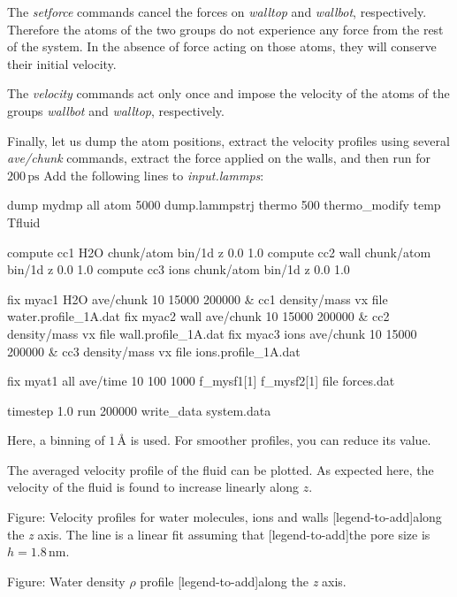 \noindent The \textit{setforce} commands cancel the forces on \textit{walltop} and
\textit{wallbot}, respectively. Therefore the atoms of the two groups do not
experience any force from the rest of the system. In the absence of force
acting on those atoms, they will conserve their initial velocity.

\vspace{0.25cm} \noindent The \textit{velocity} commands act only once and impose
the velocity of the atoms of the groups \textit{wallbot}
and \textit{walltop}, respectively.

\vspace{0.25cm} \noindent Finally, let us dump the atom positions, extract the
velocity profiles using several \textit{ave/chunk} commands, extract the
force applied on the walls, and then run for $200\,\text{ps}$
Add the following lines to \textit{input.lammps}:

\begin{lcverbatim}
dump mydmp all atom 5000 dump.lammpstrj
thermo 500
thermo_modify temp Tfluid

compute cc1 H2O chunk/atom bin/1d z 0.0 1.0
compute cc2 wall chunk/atom bin/1d z 0.0 1.0
compute cc3 ions chunk/atom bin/1d z 0.0 1.0

fix myac1 H2O ave/chunk 10 15000 200000 &
cc1 density/mass vx file water.profile_1A.dat
fix myac2 wall ave/chunk 10 15000 200000 &
cc2 density/mass vx file wall.profile_1A.dat
fix myac3 ions ave/chunk 10 15000 200000 &
cc3 density/mass vx file ions.profile_1A.dat

fix myat1 all ave/time 10 100 1000 f_mysf1[1] f_mysf2[1] file forces.dat

timestep 1.0
run 200000
write_data system.data
\end{lcverbatim}

\noindent Here, a binning of $1\,\text{Å}$ is used. For smoother
profiles, you can reduce its value.

\vspace{0.25cm} \noindent The averaged velocity profile of the fluid 
can be plotted. As expected here, the velocity
of the fluid is found to increase linearly along $z$.

\vspace{0.25cm} Figure: Velocity profiles for water molecules, ions and walls
[legend-to-add]along the \textit{z} axis. The line is a linear fit assuming that 
[legend-to-add]the pore size is $h = 1.8\,\text{nm}$.

\vspace{0.25cm} Figure: Water density $\rho$ profile
[legend-to-add]along the \textit{z} axis.

